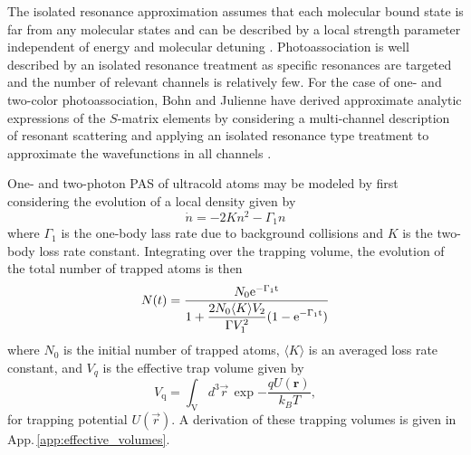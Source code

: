 The isolated resonance approximation assumes that each molecular bound state is far from any molecular states and can be described by a local strength parameter independent of energy and molecular detuning \cite{Bohn1999, Nicholson2015a}.
Photoassociation is well described by an isolated resonance treatment as specific resonances are targeted and the number of relevant channels is relatively few.
For the case of one- and two-color photoassociation, Bohn and Julienne have derived approximate analytic expressions of the $S$-matrix elements by considering a multi-channel description of resonant scattering and applying an isolated resonance type treatment to approximate the wavefunctions in all channels \cite{Bohn1999, Bohn1996, Julienne2006}.

One- and two-photon PAS of ultracold atoms may be modeled by first considering the evolution of a local density given by
\begin{equation}
	\dot{n} = - 2 K n^2 - \Gamma_1 n
\end{equation}
where $\Gamma_1$ is the one-body lass rate due to background collisions and $K$ is the two-body loss rate constant.
Integrating over the trapping volume, the evolution of the total number of trapped atoms is then
\begin{equation}\label{eq:number}
   N(t)= \frac{N_0 \rm{e}^{-\Gamma_1 t}}
   		{\displaystyle 1 + \frac{2 N_0 \langle K \rangle V_2}{\Gamma V_1^2}(1-\rm{e}^{-\Gamma_1 t}) }
\end{equation}
where $N_0$ is the initial number of trapped atoms, $\langle K \rangle$ is an averaged loss rate constant, and $V_q$ is the effective trap volume given by
\begin{equation}\label{eq:effectivevolumes}
	V_{\text{q}}=\int_{\mathrm{V}} d^3\vec{r} \, \exp{-\frac{qU(\mathbf{r})}{k_{B}T}},
\end{equation}
for trapping potential $U(\vec{r})$.
A derivation of these trapping volumes is given in App.\,\ref{app:effective_volumes}.

